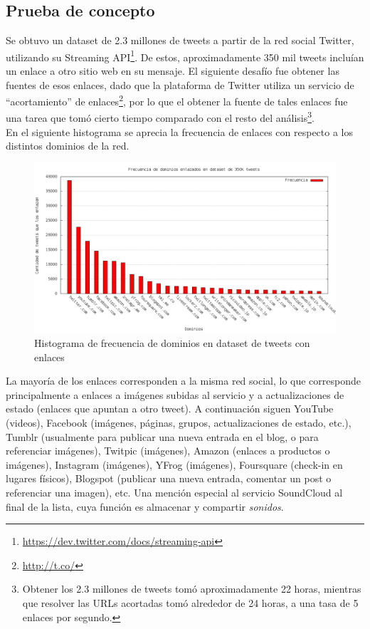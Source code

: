 \documentclass[11pt]{article}
\begin{document}
\subsection{Prueba de concepto}
\label{sec-3.2}


   Se obtuvo un dataset de 2.3 millones de tweets a partir de la red social Twitter, utilizando su Streaming API\footnote{\href{https://dev.twitter.com/docs/streaming-api}{https://dev.twitter.com/docs/streaming-api} }. De estos, aproximadamente 350 mil tweets incluían un enlace a otro sitio web en su mensaje. El siguiente desafío fue obtener las fuentes de esos enlaces, dado que la plataforma de Twitter utiliza un servicio de ``acortamiento'' de enlaces\footnote{\href{http://t.co/}{http://t.co/} }, por lo que el obtener la fuente de tales enlaces fue una tarea que tomó cierto tiempo comparado con el resto del análisis\footnote{Obtener los 2.3 millones de tweets tomó aproximadamente 22 horas, mientras que resolver las URLs acortadas tomó alrededor de 24 horas, a una tasa de 5 enlaces por segundo. }.\\

   En el siguiente histograma se aprecia la frecuencia de enlaces con respecto a los distintos dominios de la red.\\

   \begin{figure}[htb]
\centering
\includegraphics[width=15cm]{./img/dominios.png}
\caption{Histograma de frecuencia de dominios en dataset de tweets con enlaces}
\end{figure}
   
   La mayoría de los enlaces corresponden a la misma red social, lo que corresponde principalmente a enlaces a imágenes subidas al servicio y a actualizaciones de estado (enlaces que apuntan a otro tweet). A continuación siguen YouTube (videos), Facebook (imágenes, páginas, grupos, actualizaciones de estado, etc.), Tumblr (usualmente para publicar una nueva entrada en el blog, o para referenciar imágenes), Twitpic (imágenes), Amazon (enlaces a productos o imágenes), Instagram (imágenes), YFrog (imágenes), Foursquare (check-in en lugares físicos), Blogspot (publicar una nueva entrada, comentar un post o referenciar una imagen), etc. Una mención especial al servicio SoundCloud al final de la lista, cuya función es almacenar y compartir \emph{sonidos}.\\
\end{document}

